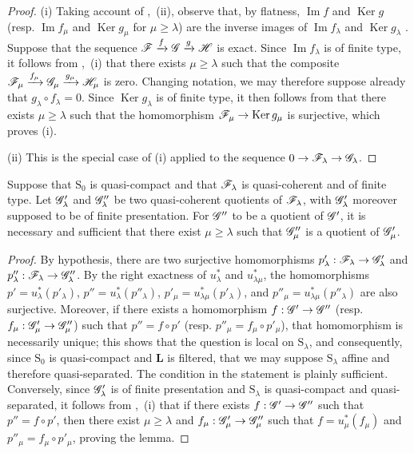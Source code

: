 \begin{proof}
(i) Taking account of ,~(ii), observe that, by flatness, $\operatorname{Im} f$ and $\operatorname{Ker} g$ (resp. $\operatorname{Im} f_\mu$ and $\operatorname{Ker} g_\mu$ for $\mu\geqslant\lambda$) are the inverse images of $\operatorname{Im} f_\lambda$ and $\operatorname{Ker} g_\lambda$ . Suppose that the sequence $\mathscr{F}\xrightarrow{f}\mathscr{G}\xrightarrow{g}\mathscr{H}$ is exact. Since $\operatorname{Im} f_\lambda$ is of finite type, it follows from ,~(i) that there exists $\mu\geqslant\lambda$ such that the composite $\mathscr{F}_\mu\xrightarrow{f_\mu}\mathscr{G}_\mu\xrightarrow{g_\mu}\mathscr{H}_\mu$ is zero. Changing notation, we may therefore suppose already that $g_\lambda\circ f_\lambda=0$. Since $\operatorname{Ker} g_\lambda$ is of finite type, it then follows from  that there exists $\mu\geqslant\lambda$ such that the homomorphism $\mathscr{F}_\mu\to\operatorname{Ker} g_\mu$ is surjective, which proves (i).

(ii) This is the special case of (i) applied to the sequence $0\to\mathscr{F}_\lambda\to\mathscr{G}_\lambda$.
\end{proof}

\begin{lemma}[8.5.9]
\label{IV.8.5.9}
Suppose that $\mathrm{S}_0$ is quasi-compact and that $\mathscr{F}_\lambda$ is quasi-coherent and of finite type. Let $\mathscr{G}'_\lambda$ and $\mathscr{G}''_\lambda$ be two quasi-coherent quotients of $\mathscr{F}_\lambda$, with $\mathscr{G}'_\lambda$ moreover supposed to be of finite presentation. For $\mathscr{G}''$ to be a quotient of $\mathscr{G}'$, it is necessary and sufficient that there exist $\mu\geqslant\lambda$ such that $\mathscr{G}''_\mu$ is a quotient of $\mathscr{G}'_\mu$.
\end{lemma}

\begin{proof}
By hypothesis, there are two surjective homomorphisms $p'_\lambda:\mathscr{F}_\lambda\to\mathscr{G}'_\lambda$ and $p''_\lambda:\mathscr{F}_\lambda\to\mathscr{G}''_\lambda$. By the right exactness of $u_\lambda^*$ and $u_{\lambda\mu}^*$, the homomorphisms $p'=u_\lambda^*(p'_\lambda)$, $p''=u_\lambda^*(p''_\lambda)$, $p'_\mu=u_{\lambda\mu}^*(p'_\lambda)$, and $p''_\mu=u_{\lambda\mu}^*(p''_\lambda)$ are also surjective. Moreover, if there exists a homomorphism $f:\mathscr{G}'\to\mathscr{G}''$ (resp. $f_\mu:\mathscr{G}'_\mu\to\mathscr{G}''_\mu$) such that $p''=f\circ p'$ (resp. $p''_\mu=f_\mu\circ p'_\mu$), that homomorphism is necessarily unique; this shows that the question is local on $\mathrm{S}_\lambda$, and consequently, since $\mathrm{S}_0$ is quasi-compact and $\mathbf{L}$ is filtered, that we may suppose $\mathrm{S}_\lambda$ affine and therefore quasi-separated. The condition in the statement is plainly sufficient. Conversely, since $\mathscr{G}'_\lambda$ is of finite presentation and $\mathrm{S}_\lambda$ is quasi-compact and quasi-separated, it follows from ,~(i) that if there exists $f:\mathscr{G}'\to\mathscr{G}''$ such that $p''=f\circ p'$, then there exist $\mu\geqslant\lambda$ and $f_\mu:\mathscr{G}'_\mu\to\mathscr{G}''_\mu$ such that $f=u_\mu^*(f_\mu)$ and $p''_\mu=f_\mu\circ p'_\mu$, proving the lemma.
\end{proof}

